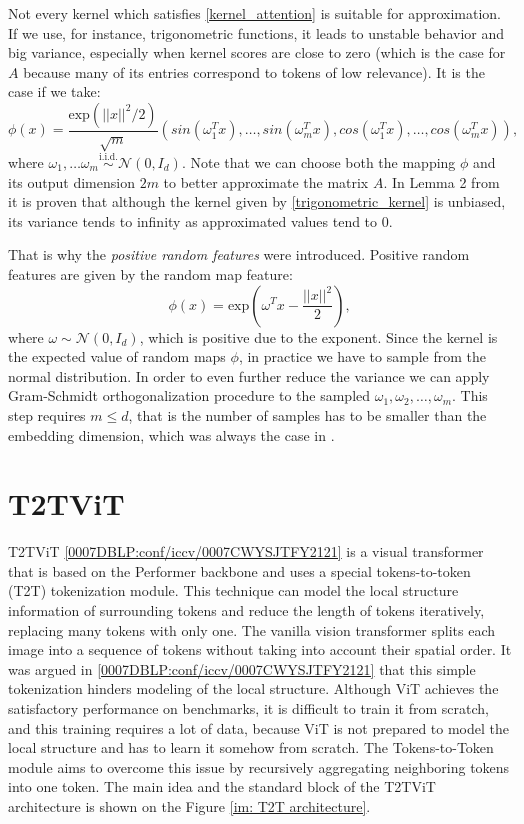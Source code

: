 \documentclass[magisterska,en]{pracamgr}
\begin{document}
Not every kernel which satisfies \ref{kernel_attention} is suitable for approximation. If we use, for instance, trigonometric functions, it leads to unstable behavior and big variance, especially when kernel scores are close to zero (which is the case for $A$ because many of its entries correspond to tokens of low relevance). It is the case if we take:
\begin{equation}
    \phi(x) = \frac{\textrm{exp}(||x||^2/2)}{\sqrt{m}}\left(sin(\omega _1^T x), \ldots, sin(\omega _m^T x), cos(\omega _1^T x), \ldots, cos(\omega _m^T x)\right),
\end{equation}\label{trigonometric_kernel}
where $\omega _1, \ldots \omega _m \stackrel{\textrm{i.i.d.}}{\sim} \mathcal{N}(0, I_d)$. Note that we can choose both the mapping $\phi$ and its output dimension $2m$ to better approximate the matrix $A$. In Lemma 2 from \cite{DBLP:conf/iclr/ChoromanskiLDSG21} it is proven that although the kernel given by \ref{trigonometric_kernel} is unbiased, its variance tends to infinity as approximated values tend to 0.


That is why the \textit{positive random features} were introduced. Positive random features are given by the random map feature:
\begin{equation*}
    \phi(x) = \textrm{exp}\left(\omega^T x-\frac{||x||^2}{2}\right),
\end{equation*}
where $\omega \sim \mathcal{N}(0, I_d)$, which is positive due to the exponent. Since the kernel is the expected value of random maps $\phi$, in practice we have to sample from the normal distribution. In order to even further reduce the variance we can apply Gram-Schmidt orthogonalization procedure to the sampled $\omega_1, \omega_2, \ldots, \omega_m$. This step requires $m\leq d$, that is the number of samples has to be smaller than the embedding dimension, which was always the case in \cite{DBLP:conf/iclr/ChoromanskiLDSG21}.

\section{T2T\textunderscore ViT}\label{s:T2T}

T2T\textunderscore ViT \ref{0007DBLP:conf/iccv/0007CWYSJTFY2121} is a visual transformer that is based on the Performer backbone and uses a special tokens-to-token (T2T) tokenization module. This technique can model the local structure information of surrounding tokens and reduce the length of tokens iteratively, replacing many tokens with only one. The vanilla vision transformer splits each image into a sequence of tokens without taking into account their spatial order. It was argued in \ref{0007DBLP:conf/iccv/0007CWYSJTFY2121} that this simple tokenization hinders modeling of the local structure. Although ViT achieves the satisfactory performance on benchmarks, it is difficult to train it from scratch, and this training requires a lot of data, because ViT is not prepared to model the local structure and has to learn it somehow from scratch. The Tokens-to-Token module aims to overcome this issue by recursively aggregating neighboring tokens into one token. The main idea and the standard block of the T2T\textunderscore ViT architecture is shown on the Figure \ref{im: T2T architecture}.
\end{document}
